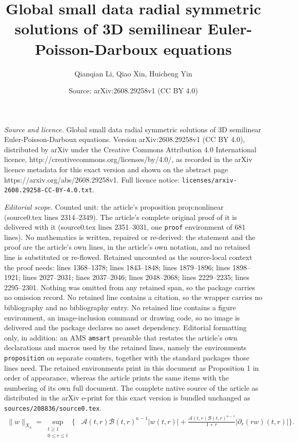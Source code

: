 \documentclass[10pt,a4paper]{amsart}
\title{Global small data radial symmetric solutions of 3D semilinear Euler-Poisson-Darboux equations}
\author{Qianqian Li, Qiao Xin, Huicheng Yin}
\date{Source: arXiv:2608.29258v1 (CC BY 4.0)}
\newcommand{\Acal}{\mathcal A}
\newcommand{\Bcal}{\mathcal B}
\newcommand{\f}{\frac}
\newcommand{\p}{\partial}
\begin{document}
\maketitle

\noindent\emph{Source and licence.} Global small data radial symmetric solutions of 3D semilinear Euler-Poisson-Darboux equations. Version arXiv:2608.29258v1 (CC BY 4.0), distributed by arXiv under the Creative Commons Attribution 4.0 International licence, http://creativecommons.org/licenses/by/4.0/, as recorded in the arXiv licence metadata for this exact version and shown on the abstract page https://arxiv.org/abs/2608.29258v1. Full licence notice: \texttt{licenses/arxiv-2608.29258-CC-BY-4.0.txt}.\par\smallskip

\noindent\textit{Editorial scope.} Counted unit: the article's proposition prop:nonlinear (source0.tex lines 2314--2349). The article's complete original proof of it is delivered with it (source0.tex lines 2351--3031, one \texttt{proof} environment of 681 lines). No mathematics is written, repaired or re-derived: the statement and the proof are the article's own lines, in the article's own notation, and no retained line is substituted or re-flowed.  Retained uncounted as the source-local context the proof needs: lines 1368--1378; lines 1843--1848; lines 1879--1896; lines 1898--1921; lines 2027--2031; lines 2037--2046; lines 2048--2068; lines 2229--2235; lines 2295--2301.  Nothing was omitted from any retained span, so the package carries no omission record.  No retained line contains a citation, so the wrapper carries no bibliography and no bibliography entry.  No retained line contains a figure environment, an image-inclusion command or drawing code, so no image is delivered and the package declares no asset dependency.  Editorial formatting only, in addition: an AMS \texttt{amsart} preamble that restates the article's own declarations and macros used by the retained lines, namely the environments \texttt{proposition} on separate counters, together with the standard packages those lines need.  The retained environments print in this document as Proposition 1 in order of appearance, whereas the article prints the same items with the numbering of its own full document.  The complete native source of the article as distributed in the arXiv e-print for this exact version is bundled unchanged as \texttt{sources/208836/source0.tex}.
\begin{equation}\label{eq:Xkappa}
\begin{aligned}
\|w\|_{X_\kappa}
=\sup_{\substack{t\geq1\\0\leq r\leq t}}
\big\{
&\Acal(t,r)\Bcal(t,r)^{\kappa-1}|w(t,r)|+
\f{\Acal(t,r)\Bcal(t,r)^{\kappa-1}}{1+r}
\left|\p_r(rw)(t,r)\right|
\big\}.
\end{aligned}
\end{equation}
\end{document}
